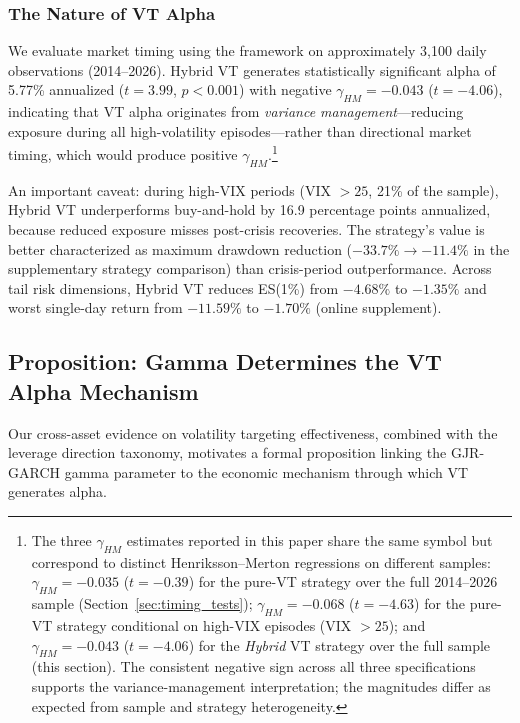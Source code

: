 \subsubsection{The Nature of VT Alpha}
\label{sec:vt_alpha_nature}

We evaluate market timing using the \citet{henriksson1981} framework on approximately 3,100 daily observations (2014--2026). Hybrid VT generates statistically significant alpha of 5.77\% annualized ($t = 3.99$, $p < 0.001$) with negative $\gamma_{HM} = -0.043$ ($t = -4.06$), indicating that VT alpha originates from \textit{variance management}---reducing exposure during all high-volatility episodes---rather than directional market timing, which would produce positive $\gamma_{HM}$.\footnote{The three $\gamma_{HM}$ estimates reported in this paper share the same symbol but correspond to distinct Henriksson--Merton regressions on different samples: $\gamma_{HM} = -0.035$ ($t = -0.39$) for the pure-VT strategy over the full 2014--2026 sample (Section~\ref{sec:timing_tests}); $\gamma_{HM} = -0.068$ ($t = -4.63$) for the pure-VT strategy conditional on high-VIX episodes (VIX $>25$); and $\gamma_{HM} = -0.043$ ($t = -4.06$) for the \emph{Hybrid} VT strategy over the full sample (this section). The consistent negative sign across all three specifications supports the variance-management interpretation; the magnitudes differ as expected from sample and strategy heterogeneity.}

An important caveat: during high-VIX periods (VIX $> 25$, 21\% of the sample), Hybrid VT underperforms buy-and-hold by 16.9 percentage points annualized, because reduced exposure misses post-crisis recoveries. The strategy's value is better characterized as maximum drawdown reduction ($-33.7\% \to -11.4\%$ in the supplementary strategy comparison) than crisis-period outperformance. Across tail risk dimensions, Hybrid VT reduces ES(1\%) from $-4.68\%$ to $-1.35\%$ and worst single-day return from $-11.59\%$ to $-1.70\%$ (online supplement).

\subsection{Proposition: Gamma Determines the VT Alpha Mechanism}
\label{sec:gamma-mechanism}

Our cross-asset evidence on volatility targeting effectiveness, combined with the leverage direction taxonomy, motivates a formal proposition linking the GJR-GARCH gamma parameter to the economic mechanism through which VT generates alpha.

